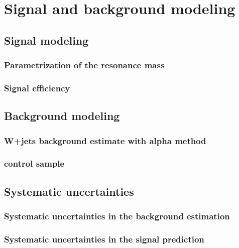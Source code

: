\chapter{Signal and background modeling}
\label{ch:sigAndBkgModel}

\section{Signal modeling}
\subsection{Parametrization of the resonance mass}
\subsection{Signal efficiency}

\section{Background modeling}
\subsection{W+jets background estimate with alpha method}
\subsection{\ttbar control sample}

\section{Systematic uncertainties}
\subsection{Systematic uncertainties in the background estimation}
\subsection{Systematic uncertainties in the signal prediction}
